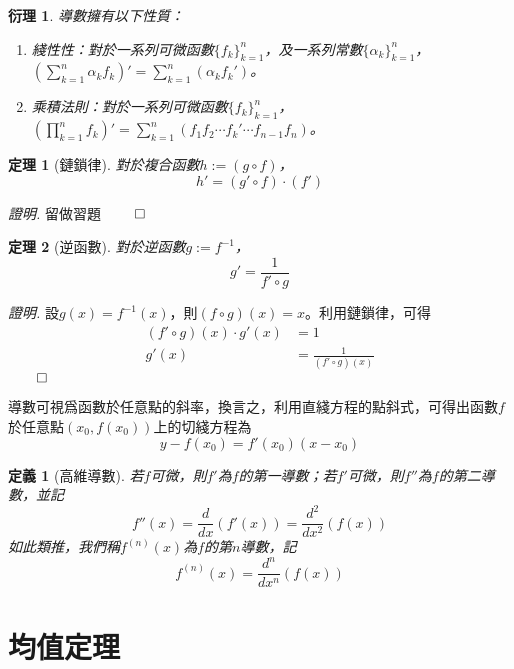 \documentclass[12pt]{article}
\newtheorem{definition}{定義}
\newtheorem*{theorem}{定理}
\newtheorem*{corollary}{衍理}
\renewenvironment*{proof}{\textit{證明.}}{\hfill$\qed$}
\begin{document}
    \begin{corollary}
        導數擁有以下性質：\begin{enumerate}
            \item 綫性性：對於一系列可微函數$\{f_k\}_{k=1}^n$，及一系列常數$\{\alpha_k\}_{k=1}^n$，$\displaystyle(\sum_{k=1}^{n}\alpha_k f_k)'=\sum_{k=1}^{n}(\alpha_k f_k')$。
            \item 乘積法則：對於一系列可微函數$\{f_k\}_{k=1}^n$，$\displaystyle(\prod_{k=1}^{n}f_k)'=\sum_{k=1}^{n}(f_1f_2\cdots f_k'\cdots f_{n-1}f_n)$。
        \end{enumerate}
    \end{corollary}

    \begin{theorem}[鏈鎖律]
        對於複合函數$h:=(g\circ f)$，$$h'=(g'\circ f)\cdot(f')$$
    \end{theorem}

    \begin{proof}
        留做習題
    \end{proof}

    \begin{theorem}[逆函數]
        對於逆函數$g:=f^{-1}$，$$g'=\frac{1}{f'\circ g}$$
    \end{theorem}

    \begin{proof}
        設$g(x)=f^{-1}(x)$，則$(f\circ g)(x)=x$。利用鏈鎖律，可得\begin{align*}
            (f'\circ g)(x)\cdot g'(x)&=1\\
            g'(x)&=\frac{1}{(f'\circ g)(x)}
        \end{align*}
    \end{proof}

    導數可視爲函數於任意點的斜率，換言之，利用直綫方程的點斜式，可得出函數$f$於任意點$(x_0,f(x_0))$上的切綫方程為$$y-f(x_0)=f'(x_0)(x-x_0)$$

    \begin{definition}[高維導數]
        若$f$可微，則$f'$為$f$的第一導數；若$f'$可微，則$f''$為$f$的第二導數，並記$$f''(x)=\dfrac{d}{dx}(f'(x))=\dfrac{d^2}{dx^2}(f(x))$$如此類推，我們稱$f^{(n)}(x)$為$f$的第$n$導數，記$$f^{(n)}(x)=\dfrac{d^n}{dx^n}(f(x))$$
    \end{definition}

    \section*{均值定理}
\end{document}
